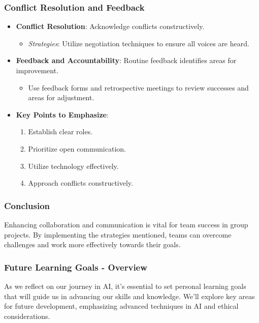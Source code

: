 \documentclass[aspectratio=169]{beamer}
\begin{document}
\begin{frame}[fragile]
    \frametitle{Conflict Resolution and Feedback}
    \begin{itemize}
        \item \textbf{Conflict Resolution}: Acknowledge conflicts constructively. 
        \begin{itemize}
            \item \textit{Strategies}: Utilize negotiation techniques to ensure all voices are heard.
        \end{itemize}
        
        \item \textbf{Feedback and Accountability}: Routine feedback identifies areas for improvement.
        \begin{itemize}
            \item Use feedback forms and retrospective meetings to review successes and areas for adjustment.
        \end{itemize}
        
        \item \textbf{Key Points to Emphasize}:
        \begin{enumerate}
            \item Establish clear roles.
            \item Prioritize open communication.
            \item Utilize technology effectively.
            \item Approach conflicts constructively.
        \end{enumerate}
    \end{itemize}
\end{frame}

\begin{frame}[fragile]
    \frametitle{Conclusion}
    Enhancing collaboration and communication is vital for team success in group projects. By implementing the strategies mentioned, teams can overcome challenges and work more effectively towards their goals.
\end{frame}

\begin{frame}[fragile]
    \frametitle{Future Learning Goals - Overview}
    As we reflect on our journey in AI, it's essential to set personal learning goals that will guide us in advancing our skills and knowledge.  
    We’ll explore key areas for future development, emphasizing advanced techniques in AI and ethical considerations.
\end{frame}
\end{document}
